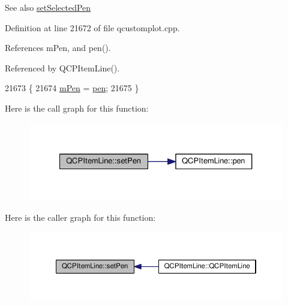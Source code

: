 \begin{DoxySeeAlso}{See also}
\hyperlink{class_q_c_p_item_line_a3e2fec44503277e77717e9c24f87f1ea}{set\+Selected\+Pen} 
\end{DoxySeeAlso}


Definition at line 21672 of file qcustomplot.\+cpp.



References m\+Pen, and pen().



Referenced by Q\+C\+P\+Item\+Line().


\begin{DoxyCode}
21673 \{
21674   \hyperlink{class_q_c_p_item_line_abbb544d5bb927dfe4e81a7f3ca4c65ac}{mPen} = \hyperlink{class_q_c_p_item_line_a235779dd079a263bedb20b3daecc40eb}{pen};
21675 \}
\end{DoxyCode}


Here is the call graph for this function\+:\nopagebreak
\begin{figure}[H]
\begin{center}
\leavevmode
\includegraphics[width=327pt]{class_q_c_p_item_line_a572528dab61c1abe205822fbd5db4b27_cgraph}
\end{center}
\end{figure}




Here is the caller graph for this function\+:\nopagebreak
\begin{figure}[H]
\begin{center}
\leavevmode
\includegraphics[width=350pt]{class_q_c_p_item_line_a572528dab61c1abe205822fbd5db4b27_icgraph}
\end{center}
\end{figure}


\hypertarget{class_q_c_p_item_line_a3e2fec44503277e77717e9c24f87f1ea}{}
